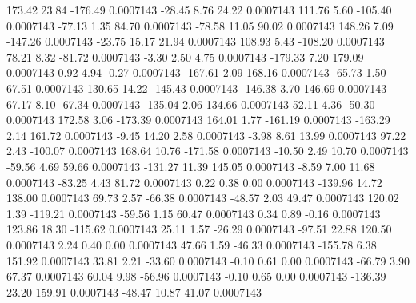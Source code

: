       173.42       23.84     -176.49     0.0007143
      -28.45        8.76       24.22     0.0007143
      111.76        5.60     -105.40     0.0007143
      -77.13        1.35       84.70     0.0007143
      -78.58       11.05       90.02     0.0007143
      148.26        7.09     -147.26     0.0007143
      -23.75       15.17       21.94     0.0007143
      108.93        5.43     -108.20     0.0007143
       78.21        8.32      -81.72     0.0007143
       -3.30        2.50        4.75     0.0007143
     -179.33        7.20      179.09     0.0007143
        0.92        4.94       -0.27     0.0007143
     -167.61        2.09      168.16     0.0007143
      -65.73        1.50       67.51     0.0007143
      130.65       14.22     -145.43     0.0007143
     -146.38        3.70      146.69     0.0007143
       67.17        8.10      -67.34     0.0007143
     -135.04        2.06      134.66     0.0007143
       52.11        4.36      -50.30     0.0007143
      172.58        3.06     -173.39     0.0007143
      164.01        1.77     -161.19     0.0007143
     -163.29        2.14      161.72     0.0007143
       -9.45       14.20        2.58     0.0007143
       -3.98        8.61       13.99     0.0007143
       97.22        2.43     -100.07     0.0007143
      168.64       10.76     -171.58     0.0007143
      -10.50        2.49       10.70     0.0007143
      -59.56        4.69       59.66     0.0007143
     -131.27       11.39      145.05     0.0007143
       -8.59        7.00       11.68     0.0007143
      -83.25        4.43       81.72     0.0007143
        0.22        0.38        0.00     0.0007143
     -139.96       14.72      138.00     0.0007143
       69.73        2.57      -66.38     0.0007143
      -48.57        2.03       49.47     0.0007143
      120.02        1.39     -119.21     0.0007143
      -59.56        1.15       60.47     0.0007143
        0.34        0.89       -0.16     0.0007143
      123.86       18.30     -115.62     0.0007143
       25.11        1.57      -26.29     0.0007143
      -97.51       22.88      120.50     0.0007143
        2.24        0.40        0.00     0.0007143
       47.66        1.59      -46.33     0.0007143
     -155.78        6.38      151.92     0.0007143
       33.81        2.21      -33.60     0.0007143
       -0.10        0.61        0.00     0.0007143
      -66.79        3.90       67.37     0.0007143
       60.04        9.98      -56.96     0.0007143
       -0.10        0.65        0.00     0.0007143
     -136.39       23.20      159.91     0.0007143
      -48.47       10.87       41.07     0.0007143
